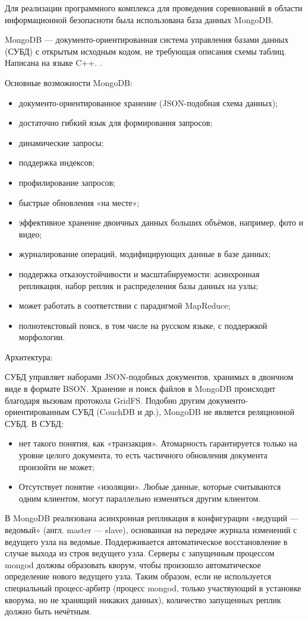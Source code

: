 Для реализации программного комплекса для проведения соревнований в области информационной безопасноти была использована база данных MongoDB.

MongoDB --- документо-ориентированная система управления базами данных (СУБД) с открытым исходным кодом, не требующая описания схемы таблиц. Написана на языке C++. \cite{mongo}.

Основные возможности MongoDB:
\begin{itemize}
\item документо-ориентированное хранение (JSON-подобная схема данных);
\item достаточно гибкий язык для формирования запросов;
\item динамические запросы;
\item поддержка индексов;
\item профилирование запросов;
\item быстрые обновления «на месте»;
\item эффективное хранение двоичных данных больших объёмов, например, фото и видео;
\item журналирование операций, модифицирующих данные в базе данных;
\item поддержка отказоустойчивости и масштабируемости: асинхронная репликация, набор реплик и распределения базы данных на узлы;
\item может работать в соответствии с парадигмой MapReduce;
\item полнотекстовый поиск, в том числе на русском языке, с поддержкой морфологии.
\end{itemize}

Архитектура:

СУБД управляет наборами JSON-подобных документов, хранимых в двоичном виде в формате BSON. Хранение и поиск файлов в MongoDB происходит благодаря вызовам протокола GridFS. Подобно другим документо-ориентированным СУБД (CouchDB и др.), MongoDB не является реляционной СУБД. В СУБД:

\begin{itemize}
\item нет такого понятия, как «транзакция». Атомарность гарантируется только на уровне целого документа, то есть частичного обновления документа произойти не может;
\item Отсутствует понятие «изоляции». Любые данные, которые считываются одним клиентом, могут параллельно изменяться другим клиентом.
\end{itemize}

В MongoDB реализована асинхронная репликация в конфигурации «ведущий — ведомый» (англ. master — slave), основанная на передаче журнала изменений с ведущего узла на ведомые. Поддерживается автоматическое восстановление в случае выхода из строя ведущего узла. Серверы с запущенным процессом mongod должны образовать кворум, чтобы произошло автоматическое определение нового ведущего узла. Таким образом, если не используется специальный процесс-арбитр (процесс mongod, только участвующий в установке кворума, но не хранящий никаких данных), количество запущенных реплик должно быть нечётным.
